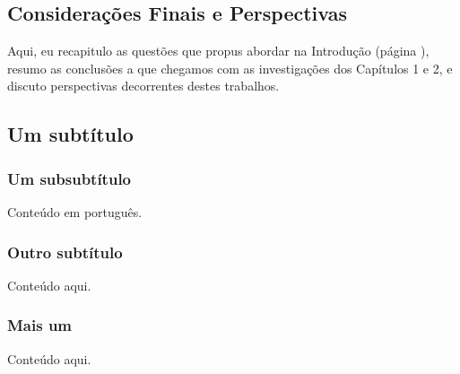 \begin{refsection}
\chapter*{Considerações Finais e Perspectivas}
\pagestyle{fancy}
\fancyhf{}
\fancyfoot[C]{\thepage}
\label{chap:conclusions}


\lettrine[lines=3]{\color{airforceblue}A}{}qui, eu recapitulo as questões que propus abordar na Introdução (página \pageref{subsec:Perguntas}), resumo as conclusões a que chegamos com as investigações dos Capítulos 1 e 2, e discuto perspectivas decorrentes destes trabalhos.

\section{Um subtítulo}

\subsection{Um subsubtítulo}
Conteúdo em português.
\subsection{Outro subtítulo}
Conteúdo aqui.
\subsection{Mais um} %
Conteúdo aqui.

\end{refsection}
